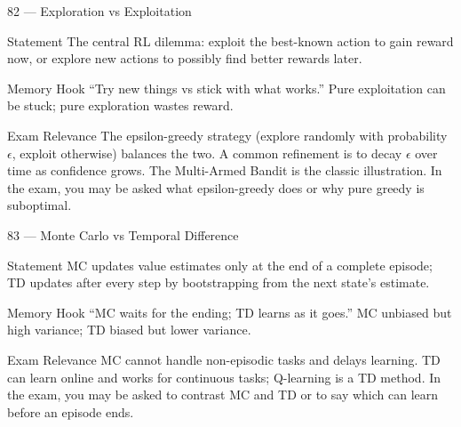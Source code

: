 \documentclass[aspectratio=169,8pt]{beamer}
\begin{document}
	\begin{frame}{82 --- Exploration vs Exploitation}
		\begin{block}{Statement}
			The central RL dilemma: exploit the best-known action to gain reward now, or explore new actions to possibly find better rewards later.
		\end{block}
		\begin{block}{Memory Hook}
			``Try new things vs stick with what works.'' Pure exploitation can be stuck; pure exploration wastes reward.
		\end{block}
		\begin{block}{Exam Relevance}
			The epsilon-greedy strategy (explore randomly with probability $\epsilon$, exploit otherwise) balances the two. A common refinement is to decay $\epsilon$ over time as confidence grows. The Multi-Armed Bandit is the classic illustration. In the exam, you may be asked what epsilon-greedy does or why pure greedy is suboptimal.
		\end{block}
	\end{frame}
	
	\begin{frame}{83 --- Monte Carlo vs Temporal Difference}
		\begin{block}{Statement}
			MC updates value estimates only at the end of a complete episode; TD updates after every step by bootstrapping from the next state's estimate.
		\end{block}
		\begin{block}{Memory Hook}
			``MC waits for the ending; TD learns as it goes.'' MC unbiased but high variance; TD biased but lower variance.
		\end{block}
		\begin{block}{Exam Relevance}
			MC cannot handle non-episodic tasks and delays learning. TD can learn online and works for continuous tasks; Q-learning is a TD method. In the exam, you may be asked to contrast MC and TD or to say which can learn before an episode ends.
		\end{block}
	\end{frame}
	
\end{document}
